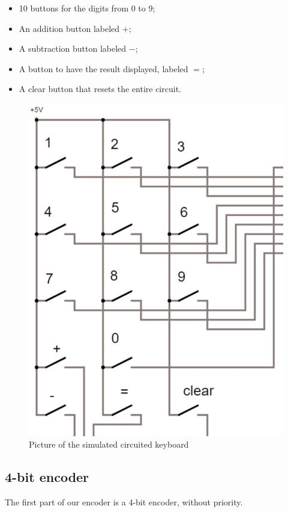 \documentclass{article}
\begin{document}
\begin{itemize}
    \item 10 buttons for the digits from 0 to 9;
    \item An addition button labeled $+$;
    \item A subtraction button labeled $-$;
    \item A button to have the result displayed, labeled $=$;
    \item A clear button that resets the entire circuit.
\end{itemize}

\begin{figure}[h]
    \centering
    \includegraphics[scale=.3]{IM_Keyboard}
    \caption{Picture of the simulated circuited keyboard}
    \label{Keybaord}
\end{figure}

\clearpage

\subsection{4-bit encoder}
The first part of our encoder is a 4-bit encoder, without priority. 
\end{document}
